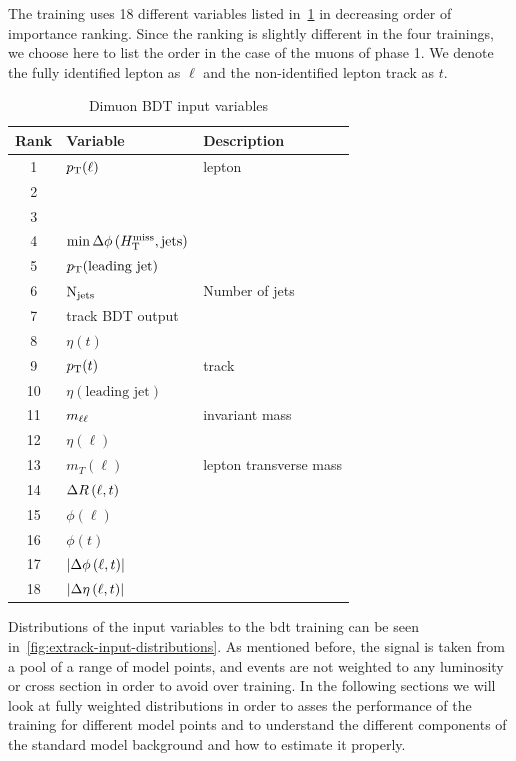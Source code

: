 The training uses 18 different variables listed in~\ref{tab:extrack-bdt-variables} in decreasing order of importance ranking. Since the ranking is slightly different in the four trainings, we choose here to list the order in the case of the muons of phase 1. We denote the fully identified lepton as $\ell$ and the non-identified lepton track as $t$.

\begin{table}[!htb]
	\centering
	\label{tab:extrack-bdt-variables}
		\caption{Dimuon BDT input variables}
			\begin{tabular}{cll} \hline
			Rank & Variable & Description \\ \hline
			1 & $p_{\mathrm{T}}(\ell)$ & lepton \pt\\
			2 & \HT & \\
			3 & \mht & \\
			4 & $\min{\Delta\phi\left(\ensuremath{H_{\mathrm{T}}^{\text{miss}}},\mathrm{jets}\right)}$ & \\
			5 & $p_{\mathrm{T}}(\text{leading jet})$ & \\
			6 & $\mathrm{N}_{\mathrm{jets}}$ & Number of jets \\					7 & track BDT output & \\
			8 & $\eta(t)$ & \\
			9 & $p_{\mathrm{T}}(t)$ & track \pt\\
			10 & $\eta(\text{leading jet})$ & \\				11 & $m_{\ell\ell}$ & invariant mass \\
			12 & $\eta(\ell)$ & \\
			13 & $m_T(\ell)$ & lepton transverse mass\\			
			14 & $\Delta R\left(\ell, t\right)$ & \\
			15 & $\phi(\ell)$ & \\
			16 & $\phi(t)$ & \\
			17 & $\lvert \Delta\phi\left(\ell,t \right) \rvert$ & \\			
			18 & $\lvert \Delta \eta \left(\ell, t\right)  \rvert$ & \\			
			\hline
			\end{tabular}
\end{table}

Distributions of the input variables to the \gls{bdt} training can be seen in~\ref{fig:extrack-input-distributions}. As mentioned before, the signal is taken from a pool of a range of model points, and events are not weighted to any luminosity or cross section in order to avoid over training. In the following sections we will look at fully weighted distributions in order to asses the performance of the training for different model points and to understand the different components of the standard model background and how to estimate it properly.

